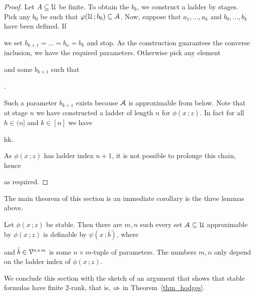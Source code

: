 \documentclass[scombinatorics.tex]{subfiles}
\begin{document}
\begin{proof}
  Let $A\subseteq\EuScript U$ be finite.
  To obtain the $b_k$, we construct a ladder by stages.
  Pick any $b_0$ be such that $\varphi(\EuScript U\,;b_0)\subseteq\EuScript A$.
  Now, suppose that $a_1,\dots,a_k$ and $b_0,\dots,b_k$ have been defined.
  If 
  \\[-1ex]

  we set $b_{k+1}=\dots=b_n=b_k$ and stop.
  As the construction guarantees the converse inclusion, we have the required parameters.
  Otherwise pick any element


  and some $b_{k+1}$ such that

  .

  Such a parameter $b_{k+1}$ exists because $\EuScript A$ is approximable from below.
  Note that at stage $n$ we have constructed a ladder of length $n$ for $\phi(x\,;z)$.
  In fact for all $h\in(n]$ and $k\in[n]$ we have
  
  {\IFF}
  {h\le k.}
  
  As $\phi(x\,;z)$ has ladder index $n+1$, it is not possible to prolonge this chain, hence


  as required.
\end{proof}
  
The main theorem of this section is an immediate corollary is the three lemmas above.

\begin{theorem}\label{thm_stable_definability}
  Let $\phi(x\,;z)$ be stable.
  Then there are $m, n$ such every set $\EuScript A\subseteq\EuScript U$ approximable by $\phi(x\,;z)$ is definable by $\psi(x\,;\bar b)$, where

  
  and $\bar b\in\EuScript V^{n\times m}$ is some $n{\times}m$-tuple of parameters. The numbers $m,n$ only depend on the ladder index of $\phi(x\,;z)$.\QED
\end{theorem}

We conclude this section with the sketch of an argument that shows that stable formulas have finite 2-rank, that is, $\Rightarrow$ in Theorem~\ref{thm_hodges}.
\end{document}

